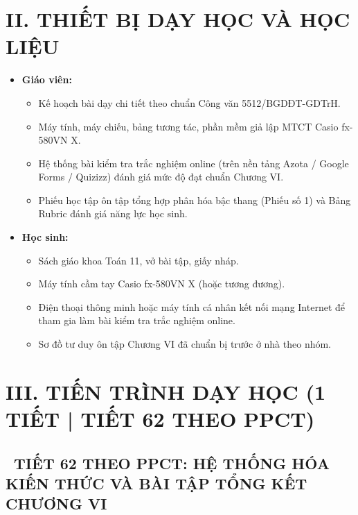 \documentclass[12pt, a4paper]{article}
\begin{document}
\vspace{5pt}

\section*{II. THIẾT BỊ DẠY HỌC VÀ HỌC LIỆU}

\begin{itemize}[leftmargin=1.2cm]
    \item \textbf{Giáo viên:}
    \begin{itemize}[leftmargin=0.6cm]
        \item Kế hoạch bài dạy chi tiết theo chuẩn Công văn 5512/BGDĐT-GDTrH.
        \item Máy tính, máy chiếu, bảng tương tác, phần mềm giả lập MTCT Casio fx-580VN X.
        \item Hệ thống bài kiểm tra trắc nghiệm online (trên nền tảng Azota / Google Forms / Quizizz) đánh giá mức độ đạt chuẩn Chương VI.
        \item Phiếu học tập ôn tập tổng hợp phân hóa bậc thang (Phiếu số 1) và Bảng Rubric đánh giá năng lực học sinh.
    \end{itemize}
    \item \textbf{Học sinh:}
    \begin{itemize}[leftmargin=0.6cm]
        \item Sách giáo khoa Toán 11, vở bài tập, giấy nháp.
        \item Máy tính cầm tay Casio fx-580VN X (hoặc tương đương).
        \item Điện thoại thông minh hoặc máy tính cá nhân kết nối mạng Internet để tham gia làm bài kiểm tra trắc nghiệm online.
        \item Sơ đồ tư duy ôn tập Chương VI đã chuẩn bị trước ở nhà theo nhóm.
    \end{itemize}
\end{itemize}

\vspace{5pt}

\section*{III. TIẾN TRÌNH DẠY HỌC (1 TIẾT | TIẾT 62 THEO PPCT)}

\subsection*{\faClockO \ TIẾT 62 THEO PPCT: HỆ THỐNG HÓA KIẾN THỨC VÀ BÀI TẬP TỔNG KẾT CHƯƠNG VI}
\end{document}
